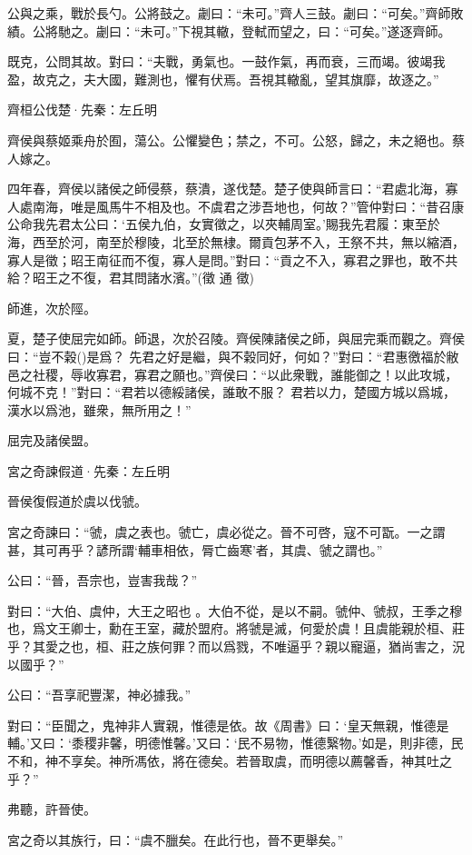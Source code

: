 \documentclass[12pt,a4paper]{ctexbook}
\begin{document}
公與之乘，戰於長勺。公將鼓之。劌曰：“未可。”齊人三鼓。劌曰：“可矣。”齊師敗績。公將馳之。劌曰：“未可。”下視其轍，登軾而望之，曰：“可矣。”遂逐齊師。\par
既克，公問其故。對曰：“夫戰，勇氣也。一鼓作氣，再而衰，三而竭。彼竭我盈，故克之，夫大國，難測也，懼有伏焉。吾視其轍亂，望其旗靡，故逐之。”\par
齊桓公伐楚·先秦：左丘明 \par
齊侯與蔡姬乘舟於囿，蕩公。公懼變色；禁之，不可。公怒，歸之，未之絕也。蔡人嫁之。\par
四年春，齊侯以諸侯之師侵蔡，蔡潰，遂伐楚。楚子使與師言曰：“君處北海，寡人處南海，唯是風馬牛不相及也。不虞君之涉吾地也，何故？”管仲對曰：“昔召康公命我先君太公曰：‘五侯九伯，女實徵之，以夾輔周室。’賜我先君履：東至於海，西至於河，南至於穆陵，北至於無棣。爾貢包茅不入，王祭不共，無以縮酒，寡人是徵；昭王南征而不復，寡人是問。”對曰：“貢之不入，寡君之罪也，敢不共給？昭王之不復，君其問諸水濱。”(徵 通 徵)\par
師進，次於陘。\par
夏，楚子使屈完如師。師退，次於召陵。齊侯陳諸侯之師，與屈完乘而觀之。齊侯曰：“豈不榖()是爲？ 先君之好是繼，與不榖同好，何如？”對曰：“君惠徼福於敝邑之社稷，辱收寡君，寡君之願也。”齊侯曰：“以此衆戰，誰能御之！以此攻城，何城不克！”對曰：“君若以德綏諸侯，誰敢不服？ 君若以力，楚國方城以爲城，漢水以爲池，雖衆，無所用之！”\par
屈完及諸侯盟。\par
宮之奇諫假道·先秦：左丘明 \par
晉侯復假道於虞以伐虢。\par
宮之奇諫曰：“虢，虞之表也。虢亡，虞必從之。晉不可啓，寇不可翫。一之謂甚，其可再乎？諺所謂‘輔車相依，脣亡齒寒’者，其虞、虢之謂也。”\par
公曰：“晉，吾宗也，豈害我哉？”\par
對曰：“大伯、虞仲，大王之昭也 。大伯不從，是以不嗣。虢仲、虢叔，王季之穆也，爲文王卿士，勳在王室，藏於盟府。將虢是滅，何愛於虞！且虞能親於桓、莊乎？其愛之也，桓、莊之族何罪？而以爲戮，不唯逼乎？親以寵逼，猶尚害之，況以國乎？”\par
公曰：“吾享祀豐潔，神必據我。”\par
對曰：“臣聞之，鬼神非人實親，惟德是依。故《周書》曰：‘皇天無親，惟德是輔。’又曰：‘黍稷非馨，明德惟馨。’又曰：‘民不易物，惟德繄物。’如是，則非德，民不和，神不享矣。神所馮依，將在德矣。若晉取虞，而明德以薦馨香，神其吐之乎？”\par
弗聽，許晉使。\par
宮之奇以其族行，曰：“虞不臘矣。在此行也，晉不更舉矣。”\par
\end{document}
